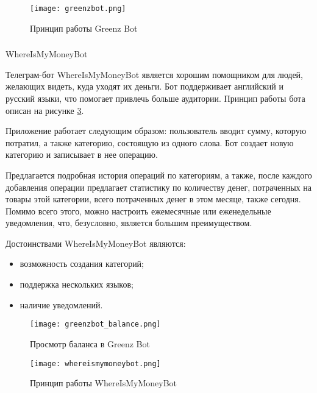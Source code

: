 \begin{figure}[!h]
	\centering
	\texttt{[image: greenzbot.png]} 
	\caption{Принцип работы Greenz Bot}
	\label{fig:analysis:analogues:greenz}
\end{figure}

\newpage

\subsubsection{} WhereIsMyMoneyBot
\label{sec:analysis:analogues:whereismymoney}

Телеграм-бот WhereIsMyMoneyBot является хорошим помощником \linebreak для людей, желающих видеть, куда уходят их деньги. Бот поддерживает английский и русский языки, что помогает привлечь больше аудитории. Принцип работы бота описан на рисунке \ref{fig:analysis:analogues:whereismymoneybot}.

Приложение работает следующим образом: пользователь вводит сумму, которую потратил, а также категорию, состоящую из одного слова. Бот создает новую категорию и записывает в нее операцию.

Предлагается подробная история операций по категориям, а также, после каждого добавления операции предлагает статистику по количеству денег, потраченных на товары этой категории, всего потраченных денег в этом месяце, также сегодня. Помимо всего этого, можно настроить ежемесячные или еженедельные уведомления, что, безусловно, является большим преимуществом.

Достоинствами WhereIsMyMoneyBot являются:

\begin{itemize}
	\item возможность создания категорий;
	\item поддержка нескольких языков;
	\item наличие уведомлений.
\end{itemize}

\begin{figure}[!h]
	\centering
	\texttt{[image: greenzbot\_balance.png]} 
	\caption{Просмотр баланса в Greenz Bot}
	\label{fig:analysis:analogues:greenz_balance}
\end{figure}

\begin{figure}[!h]
	\centering
	\texttt{[image: whereismymoneybot.png]} 
	\caption{Принцип работы WhereIsMyMoneyBot}
	\label{fig:analysis:analogues:whereismymoneybot}
\end{figure}

